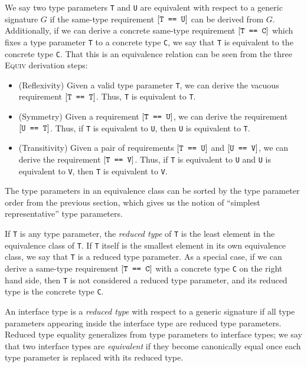 \documentclass[../generics]{subfiles}
\begin{document}
\begin{definition}
We say two type parameters \texttt{T} and \texttt{U} are equivalent with respect to a generic signature $G$ if the same-type requirement $[\texttt{T == U}]$ can be derived from $G$. Additionally, if we can derive a concrete same-type requirement $[\texttt{T == C}]$ which fixes a type parameter \texttt{T} to a concrete type \texttt{C}, we say that \texttt{T} is equivalent to the concrete type \texttt{C}. That this is an equivalence relation can be seen from the three \textsc{Equiv} derivation steps:
\begin{itemize}
\item (Reflexivity) Given a valid type parameter \texttt{T}, we can derive the vacuous requirement $[\texttt{T == T}]$. Thus, \texttt{T} is equivalent to \texttt{T}.
\item (Symmetry) Given a requirement $[\texttt{T == U}]$, we can derive the requirement $[\texttt{U == T}]$. Thus, if \texttt{T} is equivalent to \texttt{U}, then \texttt{U} is equivalent to \texttt{T}.
\item (Transitivity) Given a pair of requirements $[\texttt{T == U}]$ and $[\texttt{U == V}]$, we can derive the requirement $[\texttt{T == V}]$. Thus, if \texttt{T} is equivalent to \texttt{U} and \texttt{U} is equivalent to \texttt{V}, then \texttt{T} is equivalent to \texttt{V}.
\end{itemize}
\end{definition}
The type parameters in an equivalence class can be sorted by the type parameter order from the previous section, which gives us the notion of ``simplest representative'' type parameters.
\begin{definition}
If \texttt{T} is any type parameter, the \emph{reduced type} of \texttt{T} is the least element in the equivalence class of \texttt{T}. If \texttt{T} itself is the smallest element in its own equivalence class, we say that \texttt{T} is a reduced type parameter. As a special case, if we can derive a same-type requirement $[\texttt{T == C}]$ with a concrete type \texttt{C} on the right hand side, then \texttt{T} is not considered a reduced type parameter, and its reduced type is the concrete type \texttt{C}.
\end{definition}
\begin{definition}
An interface type is a \emph{reduced type} with respect to a generic signature if all type parameters appearing inside the interface type are reduced type parameters. Reduced type equality generalizes from type parameters to interface types; we say that two interface types are \emph{equivalent} if they become canonically equal once each type parameter is replaced with its reduced type.
\end{definition}
\end{document}
